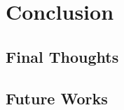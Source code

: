\chapter{Conclusion}
\label{chap:conclusion}
 
 

\section{Final Thoughts}
\label{sec:concl}

\lipsum[2]



\section{Future Works}
\label{sec:future}

\lipsum[2]
